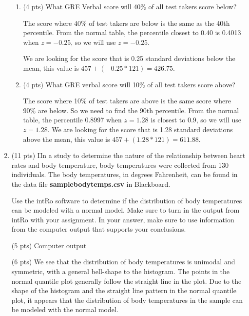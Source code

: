 \documentclass{article}
\begin{document}
\begin{enumerate}
\begin{enumerate}
\item (4 pts) What GRE Verbal score will 40\% of all test takers score below?

The score where 40\% of test takers are below is the same as the 40th percentile. From the normal table, the percentile closest to 0.40 is 0.4013 when $z = -0.25$, so we will use $z = -0.25$.

We are looking for the score that is 0.25 standard deviations below the mean, this value is $457 + (-0.25*121) = 426.75$.

\item (4 pts) What GRE verbal score will 10\% of all test takers score above?

The score where 10\% of test takers are above is the same score where 90\% are below. So we need to find the 90th percentile. From the normal table, the percentile 0.8997 when $z = 1.28$ is closest to 0.9, so we will use $z = 1.28$.  We are looking for the score that is 1.28 standard deviations above the mean, this value is $457 + (1.28*121) = 611.88$.

\end{enumerate}

\newpage

\item (11 pts) IIn a study to determine the nature of the relationship between heart rates and body temperature, body temperatures were collected from 130 individuals. The body temperatures, in degrees Fahrenheit, can be found in the  data file {\bf samplebodytemps.csv} in Blackboard.

Use the intRo software to determine if the distribution of body temperatures can be modeled with a normal model. Make sure to turn in the output from intRo with your assignment. In your answer, make sure to use information from the computer output that supports your conclusions. 

(5 pts) Computer output


(6 pts)  We see that the distribution of body temperatures is unimodal and symmetric, with a general bell-shape to the histogram.  The points in the normal quantile plot generally follow the straight line in the plot. Due to the shape of the histogram and the straight line pattern in the normal quantile plot, it appears that the distribution of body temperatures in the sample can be modeled with the normal model. 


\end{enumerate}
\end{document}
